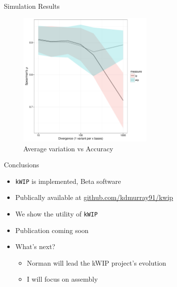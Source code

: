 \documentclass[t]{beamer}
\begin{document}
\begin{frame}{Simulation Results}
  \begin{figure}
    \centering
    \includegraphics[width=0.6\textwidth]{img/variation_vs_accuracy.pdf}
    \caption{Average variation vs Accuracy}
  \end{figure}
\end{frame}


\begin{frame}{Conclusions}
  \begin{itemize}
    \item \texttt{kWIP} is implemented, Beta software
    \item Publically available at \url{github.com/kdmurray91/kwip}
    \item We show the utility of \texttt{kWIP}
    \item Publication coming soon
    \pause
    \item What's next?
      \begin{itemize}
        \item Norman will lead the kWIP project's evolution
        \item I will focus on assembly
      \end{itemize}
  \end{itemize}
\end{frame}
\end{document}
